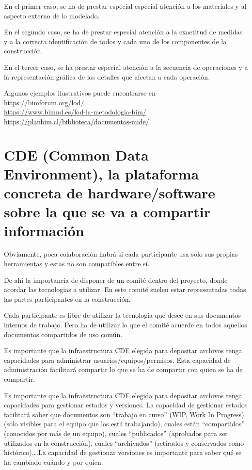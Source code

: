 \documentclass[spanish,12pt,a4paper,final,oneside]{book}
\begin{document}
En el primer caso, se ha de prestar especial especial atención a los materiales y al aspecto externo de lo modelado. 

En el segundo caso, se ha de prestar especial atención a la exactitud de medidas y a la correcta identificación de todos y cada uno de los componentes de la construcción. 

En el tercer caso, se ha prestar especial atención a la secuencia de operaciones y a la representación gráfica de los detalles que afectan a cada operación.

\vspace{0.5cm}
Algunos ejemplos ilustrativos puede encontrarse en
\\ \url{https://bimforum.org/lod/}
\\ \url{https://www.bimnd.es/lod-la-metodologia-bim/}
\\ \url{https://planbim.cl/biblioteca/documentos-mide/}


\section{CDE (Common Data Environment), la plataforma concreta de hardware/software sobre la que se va a compartir información}

Obviamente, poca colaboración habrá si cada participante usa solo sus propias herramientas y estas no son compatibles entre sí.

De ahí la importancia de disponer de un comité dentro del proyecto, donde acordar las tecnologias a utilizar. En este comité suelen estar representadas todas las partes participantes en la construcción.

Cada participante es libre de utilizar la tecnologia que desee en sus documentos internos de trabajo. Pero ha de utilizar lo que el comité acuerde en todos aquellos documentos compartidos de uso común.

Es importante que la infraestructura CDE elegida para depositar archivos tenga capacidades para administrar usuarios/equipos/permisos. Esta capacidad de administración facilitará compartir lo que se ha de compartir con quien se ha de compartir.

Es importante que la infraestructura CDE elegida para depositar archivos tenga capacidades para gestionar estados y versiones. La capacidad de gestionar estados facilitará saber que documentos son ``trabajo en curso'' (WIP, Work In Progress) (solo visibles para el equipo que los está trabajando), cuales están ``compartidos'' (conocidos por más de un equipo), cuales ``publicados'' (aprobados para ser utilizados en la construcción), cuales ``archivados'' (retirados y conservados como histórico),\ldots La capacidad de gestionar versiones es importante para saber qué se ha cambiado cuándo y por quien.
\end{document}
